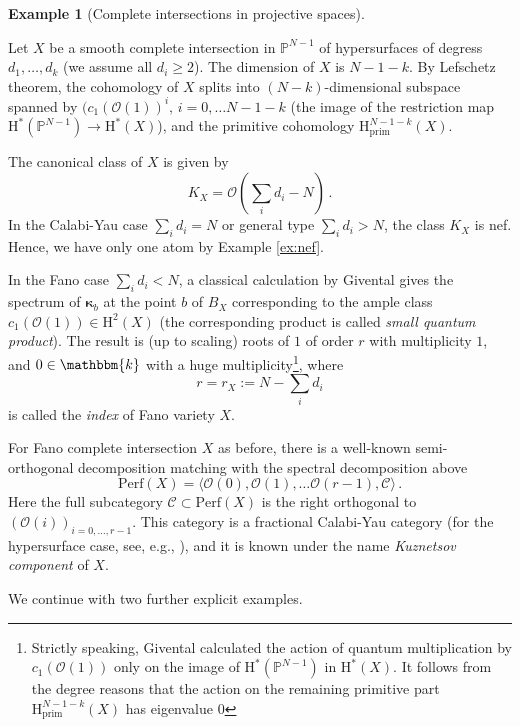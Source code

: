 \documentclass[12pt,a4paper]{amsart}
\theoremstyle{definition}
\newtheorem{example}[theorem]{Example}
\theoremstyle{remark}
\newcommand{\rH}{\mathrm{H}}
\begin{document}
 \begin{example}[Complete intersections in projective spaces]
\label{ex:complete-intersection}

Let $X$ be a smooth complete intersection in $\mathbb P^{N-1}$ of hypersurfaces of degress $d_1,\dots,d_k$ (we assume all $d_i\ge 2$). The dimension of $X$ is $N-1-k$.
By Lefschetz theorem, the cohomology of $X$ splits into $(N-k)$-dimensional subspace spanned by $(c_1(\mathcal O(1))^i,\,i=0,\dots N-1-k$ (the image of the restriction map $\rH^{\ast}(\mathbb P^{N-1})\to\rH^{\ast}(X)$), and the primitive  cohomology $\mathrm{H}^{N-1-k}_{\mathrm{prim}}(X)$.


 


 The canonical class of $X$ is given by
 $$K_X=\mathcal O(\sum_i d_i-N)\,.$$
In the Calabi-Yau case $\sum_i d_i=N$ or general type $\sum_i d_i>N$, the class $K_X$ is nef. Hence, we have only one atom by Example \ref{ex:nef}.

In the Fano case $\sum_i d_i<N$, a classical calculation by Givental \cite{Givental} gives the spectrum of $\boldsymbol{\kappa}_b$ at the point $b$ of $B_X$ corresponding to the ample class  $c_1(\mathcal O(1))\in \rH^2(X)$ (the corresponding product is called \emph{small quantum product}). The result is (up to scaling) roots of $1$ of order $r$ with multiplicity $1$, and $0\in \mathbbm{k}$ with a huge multiplicity\footnote{Strictly speaking, Givental calculated the action of quantum multiplication by $c_1(\mathcal O(1))$ only on the image of $\rH^{\ast}(\mathbb P^{N-1})$ in $\rH^{\ast}(X)$. It follows from the degree reasons  that the action on the remaining primitive part $\rH^{N-1-k}_{\mathrm{prim}}(X)$ has eigenvalue $0$}, where 
$$r=r_X:=N-\sum_i d_i$$ is called  the \textit{index} of Fano variety $X$.


For Fano complete intersection $X$ as before, there is a well-known semi-orthogonal decomposition matching with the spectral decomposition above
$$\mathrm{Perf}(X)=\langle\mathcal O(0),\mathcal O(1),\dots \mathcal O(r-1),\mathcal C\rangle\,.$$
Here  the full 
subcategory $\mathcal C\subset \mathrm{Perf}(X)$ is the right orthogonal to $(\mathcal O(i))_{i=0,\dots ,r-1}$. This category is a fractional Calabi-Yau category (for the hypersurface case, see, e.g., \cite{Kuznetsov2017}), and it is known under the name \emph{Kuznetsov component} of $X$.


 We continue with two further explicit examples.


\end{example}
\end{document}

